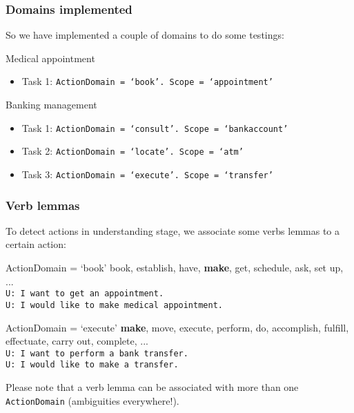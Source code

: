 \documentclass[11pt]{beamer}
\begin{document}
\begin{frame}[fragile]
\frametitle{Domains implemented}
So we have implemented a couple of domains to do some testings:
	\begin{block}{Medical appointment}
		\begin{itemize}
			\item Task 1: \texttt{ActionDomain = `book'. Scope = `appointment'}
		\end{itemize}	
	\end{block}
	\pause
	\begin{block}{Banking management}
		\begin{itemize}
			\item Task 1: \texttt{ActionDomain = `consult'. Scope = `bankaccount'}
			\item Task 2: \texttt{ActionDomain = `locate'. Scope = `atm'}
			\item Task 3: \texttt{ActionDomain = `execute'. Scope = `transfer'}
		\end{itemize}
	\end{block}
\end{frame}

\begin{frame}[fragile]
\frametitle{Verb lemmas}
To detect actions in understanding stage, we associate some verbs lemmas to a certain action:
	\footnotesize
	\begin{block}{ActionDomain = `book'}
		book, establish, have, \textbf{make}, get, schedule, ask, set up, ...\\
		\vspace{10pt}
		{\color{teal} 
			\texttt{U: I want to get an appointment.}\\
			\texttt{U: I would like to make medical appointment.}\\
		}
	\end{block}
	\pause
	\footnotesize
	\begin{block}{ActionDomain = `execute'}
		\textbf{make}, move, execute, perform, do, accomplish, fulfill, effectuate, carry out, complete, ...\\
		\vspace{10pt}
		{\color{teal} 
			\texttt{U: I want to perform a bank transfer.}\\
			\texttt{U: I would like to make a transfer.}\\
		}
	\end{block}
	\pause
	Please note that a verb lemma can be associated with more than one \texttt{ActionDomain} (ambiguities everywhere!).
\end{frame}
\end{document}
